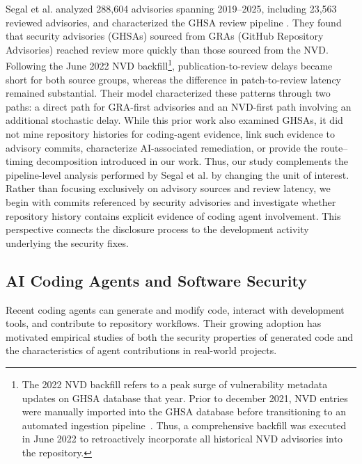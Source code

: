 \documentclass[smallextended,natbib]{svjour3}
\begin{document}
Segal et al. analyzed 288,604 advisories spanning 2019--2025, including
23,563 reviewed advisories, and characterized the GHSA review pipeline
\citep{segal2026ghsa}. They found that security advisories (GHSAs) sourced from GRAs (GitHub Repository Advisories) reached review more quickly than those sourced from the NVD. Following the June
2022 NVD backfill\footnote{The 2022 NVD backfill refers to a peak surge of vulnerability metadata updates on GHSA database that year. 
Prior to december 2021, NVD entries were manually imported into the GHSA database before transitioning to an automated ingestion pipeline~\citep{GitHubBlogNVDBackfill}. Thus, a comprehensive backfill was executed in June 2022 to retroactively incorporate all historical NVD advisories into the repository. }, publication-to-review delays became short for both
source groups, whereas the difference in patch-to-review latency remained
substantial. Their model characterized these patterns through two paths: a
direct path for GRA-first advisories and an NVD-first path involving an
additional stochastic delay. 
While this prior work also examined GHSAs, it
did not mine repository histories for coding-agent evidence, link such evidence
to advisory commits, characterize AI-associated remediation, or provide the
route--timing decomposition introduced in our work.
Thus, our study complements the pipeline-level analysis performed by Segal et al. \citep{segal2026ghsa} by changing the
unit of interest. Rather than focusing exclusively on advisory sources and
review latency, we begin with commits referenced by security advisories and
investigate whether repository history contains explicit evidence of coding
agent involvement. This perspective connects the disclosure process to the
development activity underlying the security fixes.

\subsection{AI Coding Agents and Software Security}

Recent coding agents can generate and modify code, interact with development
tools, and contribute to repository workflows. Their growing adoption has
motivated empirical studies of both the security properties of generated
code and the characteristics of agent contributions in real-world projects.
\end{document}

